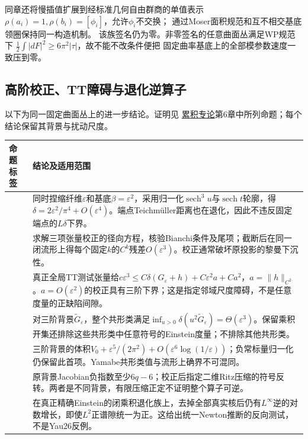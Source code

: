 \documentclass[UTF8,a4paper,11pt,fontset=fandol]{ctexart}
\numberwithin{equation}{section}
\theoremstyle{definition}
\begin{document}
同章还将慢插值扩展到经标准几何自由群商的单值表示
$\rho(a_i)=1,\rho(b_i)=[\phi_i]$，允许$\phi_i$不交换；
通过Moser面积规范和互不相交基底领圈保持同一构造机制。
该族签名仍为零。非零签名的任意曲面丛满足WP规范下
$\frac12\int|dF|^2\ge6\pi^2|\tau|$，故不能不改条件便把
固定曲率基底上的全部模参数速度一致压到零。

\subsection{高阶校正、TT障碍与退化逆算子}
以下为同一固定曲面丛上的进一步结论。证明见
\href{20260912.tex}{累积专论}第6章中所列命题；每个结论保留其背景与扰动尺度。
\begin{longtable}{L{.23\textwidth}L{.65\textwidth}}
\toprule 命题标签 & 结论及适用范围\\\midrule\endhead
{} & 同时捏缩纤维$\varepsilon$和基底$\beta=\varepsilon^2$，采用归一化$\operatorname{sech}^3u$与$\operatorname{sech}t$轮廓，得$\delta=2\varepsilon^2/\pi^4+O(\varepsilon^4)$。端点Teichmüller距离也在退化，因此不违反固定端点的$L\delta$下界。\\
 & 求解三项张量校正的径向方程，核验Bianchi条件及尾项；截断后在同一闭流形上得每个固定$k$的$C^k$残差$O(\varepsilon^3)$。校正通常破坏原投影的黎曼下沉性。\\
 & 真正全局TT测试张量给$c\varepsilon^3\le C\delta(G_\varepsilon+h)+C\varepsilon^2a+Ca^2$，$a=\|h\|_{C^2}$。$a=O(\varepsilon^2)$的校正具有三阶下界；这是指定邻域尺度障碍，不是任意度量的正缺陷间隙。\\
 & 对三阶背景$\widetilde G_\varepsilon$，整个共形类满足$\inf_{u>0}\delta(u^2\widetilde G_\varepsilon)=\Theta(\varepsilon^3)$。保留乘积开集还排除这些共形类中任意符号的Einstein度量；不排除其他共形类。\\
 & 三阶背景的体积$V_0+\varepsilon^5/(2\pi^2)+O(\varepsilon^6\log(1/\varepsilon))$；负常标量归一化仍保留此首项。Yamabe共形类值与流形上确界不可混同。\\
 & 原背景Jacobian负指数至少$6q-6$；校正后指定二维Ritz压缩的符号反转。两者是不同背景，有限压缩正定不证明整个算子可逆。\\
 & 在真正精确Einstein的闭乘积退化族上，去掉全部真实核后仍有$L^\infty$逆的对数增长，即使$L^2$正谱隙统一为正。这给出统一Newton推断的反向测试，不是Yau26反例。\\\bottomrule
\end{longtable}
\end{document}
